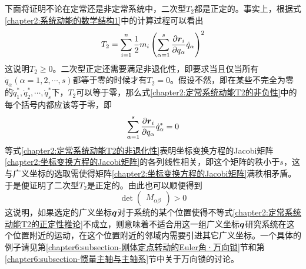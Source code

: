 下面将证明不论在定常还是非定常系统中，二次型$T_2$都是正定的。事实上，根据式\eqref{chapter2:系统动能的数学结构1}中的计算过程可以看出
\begin{equation}
	T_2 = \sum_{i=1}^n \frac12 m_i\left(\sum_{\alpha=1}^s \frac{\partial \boldsymbol{r}_i}{\partial q_\alpha} \dot{q}_\alpha\right)^2
	\label{chapter2:定常系统动能T2的非负性}
\end{equation}
这说明$T_2\geqslant 0$。二次型正定还需要满足非退化性，即要求当且仅当所有$\dot{q}_\alpha(\alpha=1,2,\cdots,s)$都等于零的时候才有$T_2=0$。假设不然，即在某些不完全为零的$\dot{q}_1^*,\dot{q}_2^*,\cdots,\dot{q}_s^*$下，$T_2$可以等于零，那么式\eqref{chapter2:定常系统动能T2的非负性}中的每个括号内都应该等于零，即
\begin{equation}
	\sum_{\alpha=1}^s\frac{\partial \boldsymbol{r}_i}{\partial q_\alpha}\dot{q}_\alpha^* = 0
	\label{chapter2:定常系统动能T2的非退化性}
\end{equation}
等式\eqref{chapter2:定常系统动能T2的非退化性}表明坐标变换方程的Jacobi矩阵\eqref{chapter2:坐标变换方程的Jacobi矩阵}的各列线性相关，即这个矩阵的秩小于$s$，这与广义坐标的选取需使得矩阵\eqref{chapter2:坐标变换方程的Jacobi矩阵}满秩相矛盾。于是便证明了二次型$T_2$是正定的。由此也可以顺便得到
\begin{equation}
	\det\begin{pmatrix} M_{\alpha\beta} \end{pmatrix} > 0
	\label{chapter2:定常系统动能T2的正定性推论}
\end{equation}
这说明，如果选定的广义坐标$\boldsymbol{q}$对于系统的某个位置使得不等式\eqref{chapter2:定常系统动能T2的正定性推论}不成立，则意味着不适合用这一组广义坐标$\boldsymbol{q}$研究系统在这个位置附近的运动，在这个位置附近的邻域内需要引进其它广义坐标。一个具体的例子请见第\ref{chapter6:subsection-刚体定点转动的Euler角·万向锁}节和第\ref{chapter6:subsection-惯量主轴与主轴系}节中关于万向锁的讨论。

